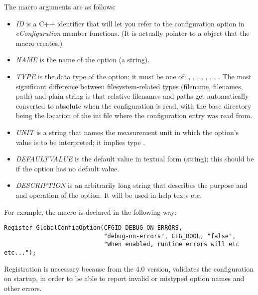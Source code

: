 The macro arguments are as follows:
\begin{itemize}
  \item \textit{ID} is a C++ identifier that will let you refer to
        the configuration option in \textit{cConfiguration} member functions.
        (It is actually pointer to a  object that
        the macro creates.)
  \item \textit{NAME} is the name of the option (a string).
  \item \textit{TYPE} is the data type of the option; it must be one of:
        , , , ,
        , , , .
        The most significant difference between filesystem-related types
        (filename, filenames, path) and plain string is that relative
        filenames and paths get automatically converted to absolute
        when the configuration is read, with the base directory being the
        location of the ini file where the configuration entry was read from.
  \item \textit{UNIT} is a string that names the measurement unit in which
        the option's value is to be interpreted; it implies type .
  \item \textit{DEFAULTVALUE} is the default value in textual form (string);
        this should be  if the option has no default value.
  \item \textit{DESCRIPTION} is an arbitrarily long string that describes
        the purpose and and operation of the option. It will be used in
        help texts etc.
\end{itemize}

For example, the  macro is declared in the following way:

\begin{verbatim}
Register_GlobalConfigOption(CFGID_DEBUG_ON_ERRORS,
                            "debug-on-errors", CFG_BOOL, "false",
                            "When enabled, runtime errors will etc etc...");
\end{verbatim}

\begin{note}
Registration is necessary because from the 4.0 version, {\opp} validates
the configuration on startup, in order to be able to report invalid or
mistyped option names and other errors.
\end{note}


